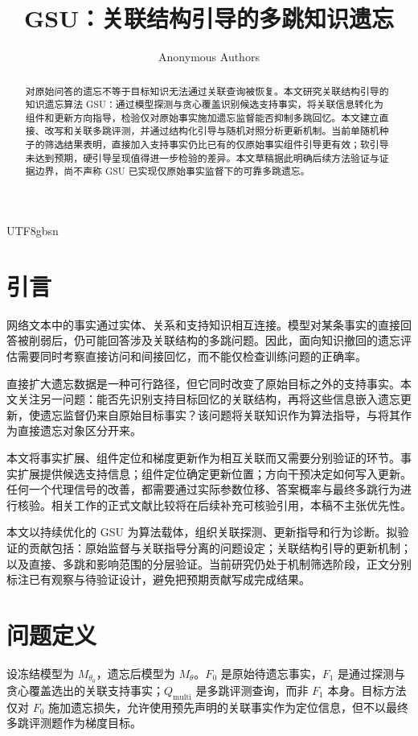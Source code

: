 \documentclass[sigconf,anonymous,review]{acmart}
\title[GSU]{GSU：关联结构引导的多跳知识遗忘}
\author{Anonymous Authors}
\begin{document}
\begin{CJK*}{UTF8}{gbsn}
\begin{abstract}
对原始问答的遗忘不等于目标知识无法通过关联查询被恢复。本文研究关联结构引导的知识遗忘算法 GSU：通过模型探测与贪心覆盖识别候选支持事实，将关联信息转化为组件和更新方向指导，检验仅对原始事实施加遗忘监督能否抑制多跳回忆。本文建立直接、改写和关联多跳评测，并通过结构化引导与随机对照分析更新机制。当前单随机种子的筛选结果表明，直接加入支持事实仍比已有的仅原始事实组件引导更有效；软引导未达到预期，硬引导呈现值得进一步检验的差异。本文草稿据此明确后续方法验证与证据边界，尚不声称 GSU 已实现仅原始事实监督下的可靠多跳遗忘。
\end{abstract}
\maketitle

\section{引言}
网络文本中的事实通过实体、关系和支持知识相互连接。模型对某条事实的直接回答被削弱后，仍可能回答涉及关联结构的多跳问题。因此，面向知识撤回的遗忘评估需要同时考察直接访问和间接回忆，而不能仅检查训练问题的正确率。

直接扩大遗忘数据是一种可行路径，但它同时改变了原始目标之外的支持事实。本文关注另一问题：能否先识别支持目标回忆的关联结构，再将这些信息嵌入遗忘更新，使遗忘监督仍来自原始目标事实？该问题将关联知识作为算法指导，与将其作为直接遗忘对象区分开来。

本文将事实扩展、组件定位和梯度更新作为相互关联而又需要分别验证的环节。事实扩展提供候选支持信息；组件定位确定更新位置；方向干预决定如何写入更新。任何一个代理信号的改善，都需要通过实际参数位移、答案概率与最终多跳行为进行核验。相关工作的正式文献比较将在后续补充可核验引用，本稿不主张优先性。

本文以持续优化的 GSU 为算法载体，组织关联探测、更新指导和行为诊断。拟验证的贡献包括：原始监督与关联指导分离的问题设定；关联结构引导的更新机制；以及直接、多跳和影响范围的分层验证。当前研究仍处于机制筛选阶段，正文分别标注已有观察与待验证设计，避免把预期贡献写成完成结果。

\section{问题定义}
设冻结模型为 $M_{\theta_0}$，遗忘后模型为 $M_\theta$。$F_0$ 是原始待遗忘事实，$F_1$ 是通过探测与贪心覆盖选出的关联支持事实；$Q_{\mathrm{multi}}$ 是多跳评测查询，而非 $F_1$ 本身。目标方法仅对 $F_0$ 施加遗忘损失，允许使用预先声明的关联事实作为定位信息，但不以最终多跳评测题作为梯度目标。


\end{CJK*}
\end{document}

